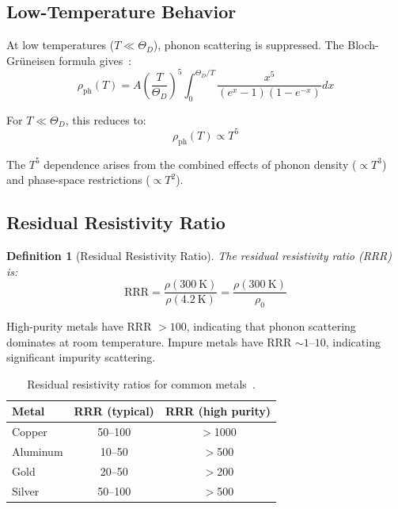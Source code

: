 \documentclass[twocolumn,showpacs,preprintnumbers,amsmath,amssymb,prd]{revtex4-2}
\newtheorem{definition}[theorem]{Definition}
\begin{document}
\subsection{Low-Temperature Behavior}

At low temperatures ($T \ll \Theta_D$), phonon scattering is suppressed. The Bloch-Gr\"{u}neisen formula gives~\cite{Ziman1960}:
\begin{equation}
\rho_{\text{ph}}(T) = A\left(\frac{T}{\Theta_D}\right)^5 \int_0^{\Theta_D/T} \frac{x^5}{(e^x - 1)(1 - e^{-x})} dx
\label{eq:bloch_gruneisen}
\end{equation}

For $T \ll \Theta_D$, this reduces to:
\begin{equation}
\rho_{\text{ph}}(T) \propto T^5
\label{eq:t5}
\end{equation}

The $T^5$ dependence arises from the combined effects of phonon density ($\propto T^3$) and phase-space restrictions ($\propto T^2$).

\subsection{Residual Resistivity Ratio}

\begin{definition}[Residual Resistivity Ratio]
\label{def:rrr}
The residual resistivity ratio (RRR) is:
\begin{equation}
\text{RRR} = \frac{\rho(300~\text{K})}{\rho(4.2~\text{K})} = \frac{\rho(300~\text{K})}{\rho_0}
\label{eq:rrr}
\end{equation}
\end{definition}

High-purity metals have RRR $> 100$, indicating that phonon scattering dominates at room temperature. Impure metals have RRR $\sim 1$--$10$, indicating significant impurity scattering.

\begin{table}[h]
\centering
\caption{Residual resistivity ratios for common metals~\cite{Haynes2016}.}
\label{tab:rrr}
\begin{tabular}{lcc}
\toprule
Metal & RRR (typical) & RRR (high purity) \\
\midrule
Copper & 50--100 & $>$1000 \\
Aluminum & 10--50 & $>$500 \\
Gold & 20--50 & $>$200 \\
Silver & 50--100 & $>$500 \\
\bottomrule
\end{tabular}
\end{table}
\end{document}
